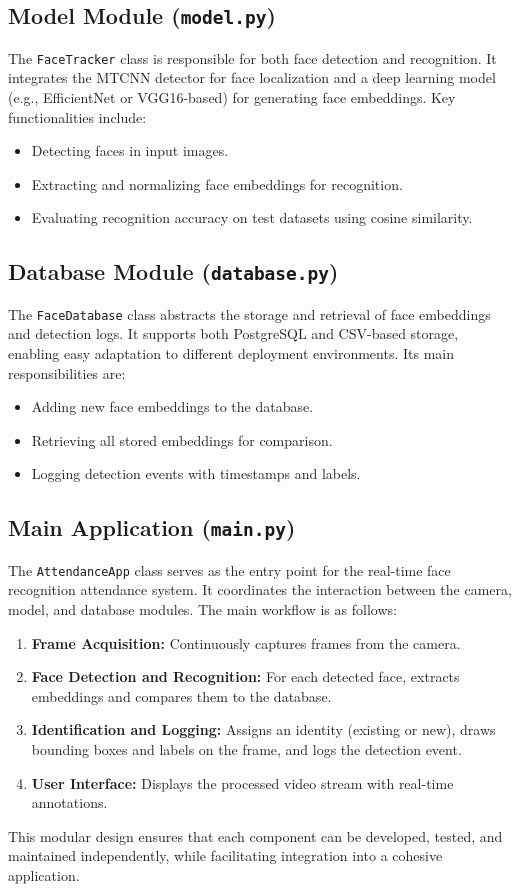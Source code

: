 \subsection{Model Module (\texttt{model.py})}
The \texttt{FaceTracker} class is responsible for both face detection and recognition. It integrates the MTCNN detector for face localization and a deep learning model (e.g., EfficientNet or VGG16-based) for generating face embeddings. Key functionalities include:
\begin{itemize}
    \item Detecting faces in input images.
    \item Extracting and normalizing face embeddings for recognition.
    \item Evaluating recognition accuracy on test datasets using cosine similarity.
\end{itemize}

\subsection{Database Module (\texttt{database.py})}
The \texttt{FaceDatabase} class abstracts the storage and retrieval of face embeddings and detection logs. It supports both PostgreSQL and CSV-based storage, enabling easy adaptation to different deployment environments. Its main responsibilities are:
\begin{itemize}
    \item Adding new face embeddings to the database.
    \item Retrieving all stored embeddings for comparison.
    \item Logging detection events with timestamps and labels.
\end{itemize}

\subsection{Main Application (\texttt{main.py})}
The \texttt{AttendanceApp} class serves as the entry point for the real-time face recognition attendance system. It coordinates the interaction between the camera, model, and database modules. The main workflow is as follows:
\begin{enumerate}
    \item \textbf{Frame Acquisition:} Continuously captures frames from the camera.
    \item \textbf{Face Detection and Recognition:} For each detected face, extracts embeddings and compares them to the database.
    \item \textbf{Identification and Logging:} Assigns an identity (existing or new), draws bounding boxes and labels on the frame, and logs the detection event.
    \item \textbf{User Interface:} Displays the processed video stream with real-time annotations.
\end{enumerate}

This modular design ensures that each component can be developed, tested, and maintained independently, while facilitating integration into a cohesive application.


